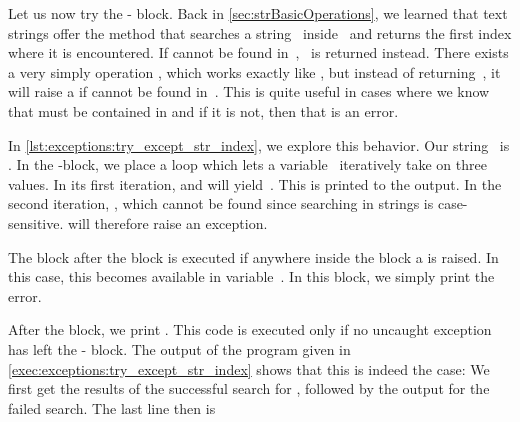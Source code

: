 \FloatBarrier%
%
%
%
Let us now try the - block.
Back in \cref{sec:strBasicOperations}, we learned that text strings offer the method  that searches a string~ inside~ and returns the first index where it is encountered.
If  cannot be found in~, ~is returned instead.
There exists a very simply operation , which works exactly like , but instead of returning~, it will raise a  if  cannot be found in~.
This is quite useful in cases where we know that  must be contained in  and if it is not, then that is an error.

In \cref{lst:exceptions:try_except_str_index}, we explore this behavior.
Our string~ is .
In the -block, we place a  loop which lets a variable~ iteratively take on three values.
In its first iteration,  and  will yield~.
This is printed to the output.
In the second iteration, , which cannot be found since searching in strings is case-sensitive.
 will therefore raise an exception.

The  block after the  block is executed if anywhere inside the  block a  is raised.
In this case, this  becomes available in variable~.
In this block, we simply print the error.

After the block, we print .
This code is executed only if no uncaught exception has left the - block.
The output of the program given in \cref{exec:exceptions:try_except_str_index} shows that this is indeed the case:
We first get the results of the successful search for , followed by the output for the failed search.
The last line then is 

